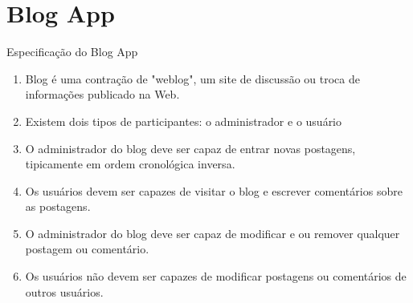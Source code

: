 \section{Blog App}
\begin{frame}{Especificação do Blog App}
	\begin{enumerate}
		\item Blog é uma contração de "weblog", um site de discussão ou troca de informações
		publicado na Web.
		\item Existem dois tipos de participantes: o administrador e o usuário
		\item O administrador do blog deve ser capaz de entrar novas postagens, tipicamente
		em ordem cronológica inversa.
		\item Os usuários devem ser capazes de visitar o blog e escrever comentários sobre
		as postagens.
		\item O administrador do blog deve ser capaz de modificar e ou remover qualquer postagem
		ou comentário.
		\item Os usuários não devem ser capazes de modificar postagens ou comentários de outros usuários.
	\end{enumerate}
\end{frame}

